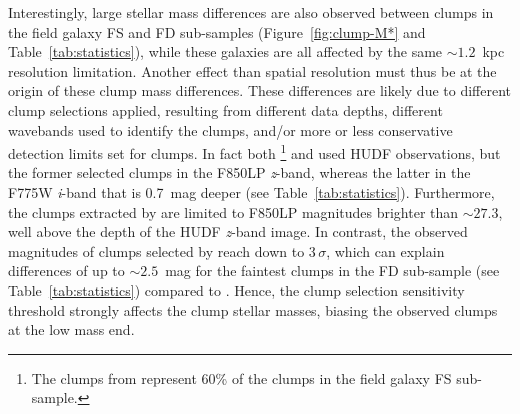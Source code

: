 \documentclass[twocolumn]{aastex61}
\begin{document}
Interestingly, large stellar mass differences are also observed between clumps 
in the field galaxy FS and FD sub-samples (Figure~\ref{fig:clump-M*} and 
Table~\ref{tab:statistics}), while these galaxies are all affected by the same 
$\sim 1.2$~kpc resolution limitation. Another effect than spatial resolution 
must thus be at the origin of these clump mass differences.
These differences are likely due to different clump selections applied, 
resulting from different data depths, different wavebands used to identify the 
clumps, and/or more or less conservative 
detection limits set for clumps. In fact both \citet{guo12}\footnote{The clumps 
from \citet{guo12} represent 60\% of the clumps in the field galaxy FS 
sub-sample.} 
and \citet{elmegreen13} used HUDF observations, but the former selected clumps 
in the F850LP {\it z}-band, whereas the latter in the F775W {\it i}-band that is 
0.7~mag deeper (see Table~\ref{tab:statistics}).
Furthermore, the clumps extracted by \citet{guo12} are limited to F850LP 
magnitudes brighter than $\sim 27.3$, well above the depth of the HUDF 
{\it z}-band image.
In contrast, the observed magnitudes of clumps selected by \citet{elmegreen13} 
reach down to $3\,\sigma$, which can explain differences of up to $\sim 2.5$~mag 
for the faintest clumps in the FD sub-sample (see Table~\ref{tab:statistics}) 
compared to \citet{guo12}. Hence, the clump selection sensitivity threshold 
strongly affects the clump stellar masses, biasing the observed clumps at the 
low mass end.
\end{document}
